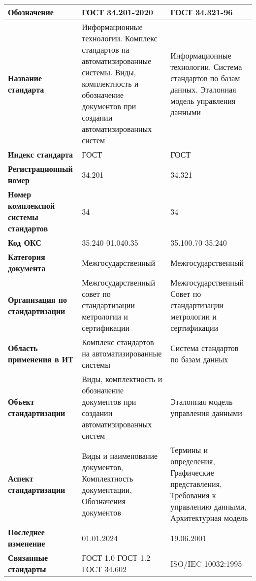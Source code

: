 \begin{table}[h!tp]
	\centering
	\caption{}
	\label{table:interstate}
	\begin{tabular}{|p{10em}|p{12em}|p{12em}|}
		\hline
		\textbf{Обозначение}
			& \textbf{ГОСТ 34.201-2020} & \textbf{ГОСТ 34.321-96} \\ \hline
		\textbf{Название стандарта}
			& Информационные технологии. Комплекс стандартов на автоматизированные системы. Виды, комплектность и обозначение документов при создании автоматизированных систем
			& Информационные технологии. Система стандартов по базам данных. Эталонная модель управления данными \\ \hline
		\textbf{Индекс стандарта} & ГОСТ & ГОСТ \\ \hline
		\textbf{Регистрационный номер} & 34.201 & 34.321 \\ \hline
		\textbf{Номер комплексной системы стандартов} & 34 & 34 \\ \hline
		\textbf{Код ОКС} & 35.240 01.040.35 & 35.100.70 35.240 \\ \hline
		\textbf{Категория документа}
			& Межгосударственный & Межгосударственный \\ \hline
		\textbf{Организация по стандартизации}
			& Межгосударственный совет по стандартизации метрологии и сертификации
			& Межгосударственный Совет по стандартизации метрологии и сертификации \\ \hline
		\textbf{Область применения в ИТ}
			& Комплекс стандартов на автоматизированные системы
			& Система стандартов по базам данных \\ \hline
		\textbf{Объект стандартизации}
			& Виды, комплектность и обозначение документов при создании автоматизированных систем
			& Эталонная модель управления данными \\ \hline
		\textbf{Аспект стандартизации}
			& Виды и наименование документов, Комплектность документации, Обозначения документов
			& Термины и определения, Графические представления, Требования к управлению данными, Архитектурная модель \\ \hline
		\textbf{Последнее изменение} & 01.01.2024 & 19.06.2001 \\ \hline
		\textbf{Связанные стандарты}
			& ГОСТ 1.0  ГОСТ 1.2  ГОСТ 34.602
			& ISO/IEC 10032:1995 \\ \hline
	\end{tabular}
\end{table}

